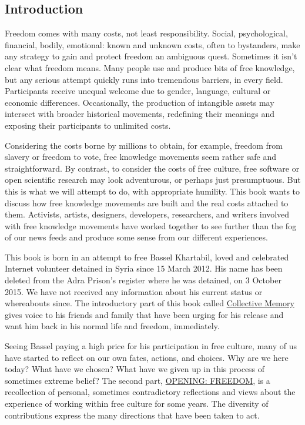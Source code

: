 \subsection{Introduction}\label{introduction}

Freedom comes with many costs, not least responsibility. Social,
psychological, financial, bodily, emotional: known and unknown costs,
often to bystanders, make any strategy to gain and protect freedom an
ambiguous quest. Sometimes it isn't clear what freedom means. Many
people use and produce bits of free knowledge, but any serious attempt
quickly runs into tremendous barriers, in every field. Participants
receive unequal welcome due to gender, language, cultural or economic
differences. Occasionally, the production of intangible assets may
intersect with broader historical movements, redefining their meanings
and exposing their participants to unlimited costs.

Considering the costs borne by millions to obtain, for example, freedom
from slavery or freedom to vote, free knowledge movements seem rather
safe and straightforward. By contrast, to consider the costs of free
culture, free software or open scientific research may look adventurous,
or perhaps just presumptuous. But this is what we will attempt to do,
with appropriate humility. This book wants to discuss how free knowledge
movements are built and the real costs attached to them. Activists,
artists, designers, developers, researchers, and writers involved with
free knowledge movements have worked together to see further than the
fog of our news feeds and produce some sense from our different
experiences.

This book is born in an attempt to free Bassel Khartabil, loved and
celebrated Internet volunteer detained in Syria since 15 March 2012. His
name has been deleted from the Adra Prison's register where he was
detained, on 3 October 2015. We have not received any information about
his current status or whereabouts since. The introductory part of this
book called \href{collective-memory/index.html}{Collective Memory} gives
voice to his friends and family that have been urging for his release
and want him back in his normal life and freedom, immediately.

Seeing Bassel paying a high price for his participation in free culture,
many of us have started to reflect on our own fates, actions, and
choices. Why are we here today? What have we chosen? What have we given
up in this process of sometimes extreme belief? The second part,
\href{opening\%3Afreedom/index.html}{OPENING: FREEDOM}, is a
recollection of personal, sometimes contradictory reflections and views
about the experience of working within free culture for some years. The
diversity of contributions express the many directions that have been
taken to act.

